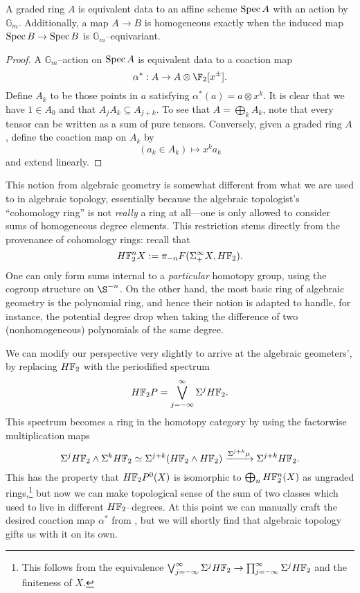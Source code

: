 \begin{lemma}\label{GradedAndGmEquivAgree}
A graded ring \(A\) is equivalent data to an affine scheme \(\operatorname{Spec} A\) with an action by \(\mathbb G_m\).  Additionally, a map \(A \to B\) is homogeneous exactly when the induced map \(\operatorname{Spec} B \to \operatorname{Spec} B\) is \(\mathbb G_m\)--equivariant.
\end{lemma}
\begin{proof}
A \(\mathbb G_m\)--action on \(\operatorname{Spec} A\) is equivalent data to a coaction map \[\alpha^*: A \to A \otimes \F_2[x^\pm].\]  Define \(A_k\) to be those points in \(a\) satisfying \(\alpha^*(a) = a \otimes x^k\).  It is clear that we have \(1 \in A_0\) and that \(A_j A_k \subseteq A_{j+k}\).  To see that \(A = \bigoplus_k A_k\), note that every tensor can be written as a sum of pure tensors.  Conversely, given a graded ring \(A\), define the coaction map on \(A_k\) by \[(a_k \in A_k) \mapsto x^k a_k\] and extend linearly.
\end{proof}

This notion from algebraic geometry is somewhat different from what we are used to in algebraic topology, essentially because the algebraic topologist's ``cohomology ring'' is not \emph{really} a ring at all---one is only allowed to consider sums of homogeneous degree elements.  This restriction stems directly from the provenance of cohomology rings: recall that \[\HFtwo^n X := \pi_{-n} F(\Susp^\infty_+ X, \HFtwo).\]  One can only form sums internal to a \emph{particular} homotopy group, using the cogroup structure on \(\S^{-n}\).  On the other hand, the most basic ring of algebraic geometry is the polynomial ring, and hence their notion is adapted to handle, for instance, the potential degree drop when taking the difference of two (nonhomogeneous) polynomials of the same degree.

We can modify our perspective very slightly to arrive at the algebraic geometers', by replacing \(\HFtwo\) with the periodified spectrum \[\HFtwo P = \bigvee_{j=-\infty}^\infty \Susp^j \HFtwo.\]  This spectrum becomes a ring in the homotopy category by using the factorwise multiplication maps \[\Susp^j \HFtwo \sm \Susp^k \HFtwo \simeq \Susp^{j+k} (\HFtwo \sm \HFtwo) \xrightarrow{\Susp^{j+k} \mu} \Susp^{j+k} \HFtwo.\]  This has the property that \(\HFtwo P^0(X)\) is isomorphic to \(\bigoplus_n \HFtwo^n(X)\) as ungraded rings,\footnote{This follows from the equivalence \(\bigvee_{j=-\infty}^\infty \Susp^j \HFtwo \to \prod_{j=-\infty}^\infty \Susp^j \HFtwo\) and the finiteness of \(X\).} but now we can make topological sense of the sum of two classes which used to live in different \(\HFtwo\)--degrees.  At this point we can manually craft the desired coaction map \(\alpha^*\) from , but we will shortly find that algebraic topology gifts us with it on its own.

